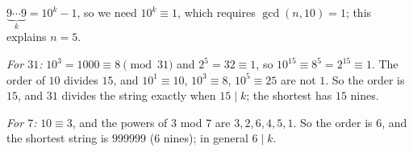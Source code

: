 $\underbrace{9\cdots9}_k=10^k-1$, so we need $10^k\equiv1$, which requires $\gcd(n,10)=1$; this explains $n=5$.

\emph{For $31$:} $10^3=1000\equiv8\pmod{31}$ and $2^5=32\equiv1$, so $10^{15}\equiv8^5=2^{15}\equiv1$. The order of $10$ divides $15$, and $10^1\equiv10$, $10^3\equiv8$, $10^5\equiv25$ are not $1$. So the order is $15$, and $31$ divides the string exactly when $15\mid k$; the shortest has $\boxed{15}$ nines.

\emph{For $7$:} $10\equiv3$, and the powers of $3$ mod $7$ are $3,2,6,4,5,1$. So the order is $6$, and the shortest string is $999999$ ($\boxed{6}$ nines); in general $6\mid k$.

